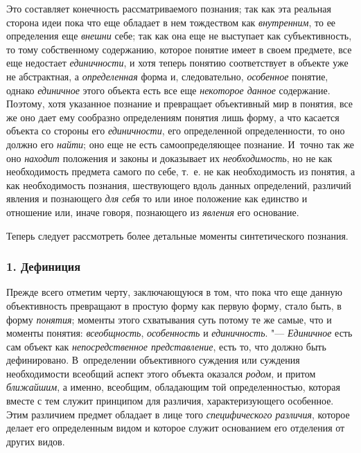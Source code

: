 Это составляет конечность рассматриваемого познания; так как
эта реальная сторона идеи пока что еще обладает в нем тождеством как
{\em внутренним}, то ее
определения еще {\em внешни}
себе; так как она еще не выступает как субъективность, то
тому собственному содержанию, которое понятие имеет в своем предмете, все
еще недостает {\em единичности},
и хотя теперь понятию соответствует в объекте уже не
абстрактная, а {\em определенная}
форма и, следовательно,
{\em особенное} понятие,
однако {\em единичное}
этого объекта есть все еще
{\em некоторое данное}
содержание. Поэтому, хотя указанное познание и превращает
объективный мир в понятия, все же оно дает ему сообразно
определениям понятия лишь форму, а что касается объекта со стороны его
{\em единичности}, его
определенной определенности, то оно должно его
{\em найти}; оно еще не
есть самоопределяющее познание. И~точно так же оно
{\em находит} положения и
законы и доказывает их
{\em необходимость}, но
не как необходимость предмета самого по себе, т.~е. не как необходимость из
понятия, а как необходимость познания, шествующего вдоль данных
определений, различий явления и познающего
{\em для себя} то или
иное положение как единство и отношение или, иначе говоря, познающего из
{\em явления} его
основание.

Теперь следует рассмотреть более детальные моменты
синтетического познания.
\subsubsection[1. Дефиниция]{\bfseries 1. Дефиниция}

Прежде всего отметим черту, заключающуюся в том, что пока что
еще данную объективность превращают в простую форму как первую форму, стало
быть, в форму {\em понятия};
моменты этого схватывания суть потому те же самые, что и
моменты понятия: {\em всеобщность},
{\em особенность} и
{\em единичность}. "---
{\em Единичное} есть сам
объект как {\em непосредственное
представление}, есть то, что должно быть дефинировано.
В~определении объективного суждения или суждения необходимости всеобщий
аспект этого объекта оказался
{\em родом}, и притом
{\em ближайшим}, а
именно, всеобщим, обладающим той определенностью, которая вместе с тем
служит принципом для различия, характеризующего особенное. Этим различием
предмет обладает в лице того
{\em специфического различия},
которое делает его определенным видом и которое служит
основанием его отделения от других видов.


